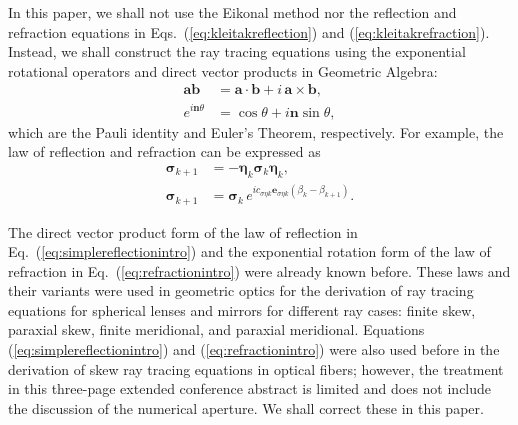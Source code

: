\documentclass[a4paper,twocolumn,superscriptaddress]{revtex4-1}
\begin{document}
In this paper, we shall not use the Eikonal method nor the reflection and refraction equations in Eqs.~(\ref{eq:kleitakreflection}) and (\ref{eq:kleitakrefraction}). Instead, we shall construct the ray tracing equations using the exponential rotational operators and direct vector products in Geometric Algebra: 
\begin{subequations}
\begin{align}
\label{eq:pauliintro}
\mathbf a \mathbf b &= \mathbf a \cdot \mathbf b + i \, \mathbf a \times \mathbf b ,
\\
\label{eq:eulerintro}
e^{i \mathbf n \theta} &= \cos \theta + i\mathbf n \sin \theta ,
\end{align}
\end{subequations}
which are the Pauli identity\cite{baylis1,lounesto} and Euler's Theorem, respectively.
For example, the law of reflection and refraction can be expressed as
\begin{subequations}
\begin{align}
\label{eq:simplereflectionintro}
      \bm \sigma_{k+1} &= 
    - \bm \eta_k \bm \sigma_k \bm \eta_k ,
  \\
  \label{eq:refractionintro}
     \bm \sigma_{k+1} &= 
  \bm \sigma_k \, e^{i c_{\sigma \eta k} \mathbf e_{\sigma \eta k} (\beta_k - \beta_{k+1} )} .
\end{align}
\end{subequations}

The direct vector product form of the law of reflection\cite{snygg, lounesto, doranBook} in Eq.~(\ref{eq:simplereflectionintro}) and the exponential rotation form of the law of refraction\cite{sugonAJP}  in Eq.~(\ref{eq:refractionintro}) were already known before. 
These laws and their variants were used in geometric optics for the derivation of ray tracing equations for spherical lenses and mirrors for different ray cases: finite skew, paraxial skew, finite meridional, and paraxial meridional\cite{sugonBook,sugonarxiv}. Equations (\ref{eq:simplereflectionintro}) and (\ref{eq:refractionintro}) were also used before in the derivation of skew ray tracing equations in optical fibers\cite{sugonSPP}; however, the treatment in this three-page extended conference abstract is limited and does not include the discussion of the numerical aperture. We shall correct these in this paper.
\end{document}
